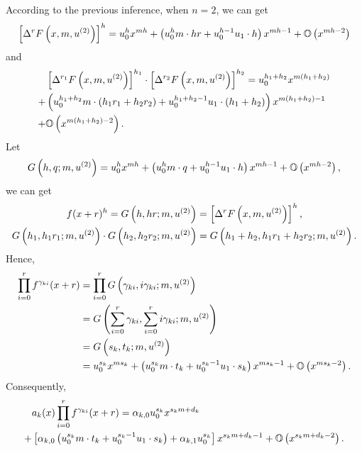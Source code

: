According to the previous inference, when $n=2$, we can get
\begin{equation}
\left[\Delta^r F\left(x,m,u^{(2)}\right)\right]^h=u_0^h x^{mh}+\left(u_0^hm\cdot hr+u_0^{h-1}u_1\cdot h\right)x^{mh-1}+\mathbb O\left(x^{mh-2}\right)
\end{equation}
and
\begin{equation}
\begin{split}
&\left[\Delta^{r_1}F\left(x,m,u^{(2)}\right)\right]^{h_1}\cdot \left[\Delta^{r_2}F\left(x,m,u^{(2)}\right)\right]^{h_2}=u_0^{h_1+h_2} x^{m(h_1+h_2)} \\
+&\left(u_0^{h_1+h_2}m\cdot (h_1r_1+h_2r_2)+u_0^{h_1+h_2-1}u_1\cdot (h_1+h_2)\right)x^{m(h_1+h_2)-1} \\
+&\mathbb O\left(x^{m(h_1+h_2)-2}\right).
\end{split}
\end{equation}
Let
\begin{equation}
G\left(h,q;m,u^{(2)}\right)=u_0^h x^{mh}+\left(u_0^hm\cdot q+u_0^{h-1}u_1\cdot h\right)x^{mh-1}+\mathbb O\left(x^{mh-2}\right),
\end{equation}
we can get
\begin{equation}
\begin{split}
f(x+r)^h=G\left(h,hr;m,u^{(2)}\right)&=\left[\Delta^r F\left(x,m,u^{(2)}\right)\right]^h, \\
G\left(h_1,h_1r_1;m,u^{(2)}\right)\cdot G\left(h_2,h_2r_2;m,u^{(2)}\right)&=G\left(h_1+h_2,h_1r_1+h_2r_2;m,u^{(2)}\right).
\end{split}
\label{key}
\end{equation}
Hence,
\begin{equation}
\begin{split}
\prod_{i=0}^r{f^{\gamma_{ki}}(x+r)}&=\prod_{i=0}^r{G\left(\gamma_{ki},i\gamma_{ki};m,u^{(2)}\right)} \\
&=G\left(\sum_{i=0}^r{\gamma_{ki}},\sum_{i=0}^r{i\gamma_{ki}};m,u^{(2)}\right) \\
&=G\left(s_k,t_k;m,u^{(2)}\right) \\
&=u_0^{s_k} x^{m{s_k}}+\left(u_0^{s_k}m\cdot {t_k}+u_0^{{s_k}-1}u_1\cdot {s_k}\right)x^{m{s_k}-1}+\mathbb O\left(x^{m{s_k}-2}\right) .
\end{split}
\end{equation}
Consequently,
\begin{equation}
\begin{split}
& a_k(x)\prod_{i=0}^r{f^{\gamma_{ki}}(x+r)} = \alpha_{k,0}u_0^{s_k} x^{{s_k}m+d_k} \\
+& \left[\alpha_{k,0}\left(u_0^{s_k}m\cdot {t_k}+u_0^{{s_k}-1}u_1\cdot {s_k}\right)+\alpha_{k,1}u_0^{s_k}\right]x^{{s_k}m+d_k-1}+\mathbb O\left(x^{{s_k}m+d_k-2}\right) .
\end{split}
\end{equation}
